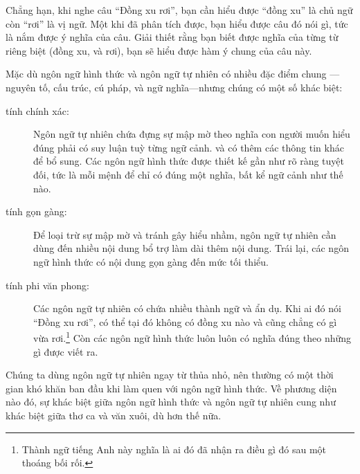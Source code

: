 \documentclass[11pt]{book}
\begin{document}

Chẳng hạn, khi nghe câu ``Đồng xu rơi'', bạn cần hiểu được ``đồng xu''
là chủ ngữ còn ``rơi'' là vị ngữ. Một khi đã phân tích được, bạn hiểu
được câu đó nói gì, tức là nắm được ý nghĩa của câu. Giải thiết rằng
bạn biết được nghĩa của từng từ riêng biệt (đồng xu, và rơi), bạn sẽ
hiểu được hàm ý chung của câu này.

Mặc dù ngôn ngữ hình thức và ngôn ngữ tự nhiên có nhiều đặc điểm chung
---nguyên tố, cấu trúc, cú pháp, và ngữ nghĩa---nhưng chúng có một
số khác biệt:


\begin{description}

\item[tính chính xác:] Ngôn ngữ tự nhiên chứa đựng sự mập mờ
theo nghĩa con người muốn hiểu đúng phải có suy luận tuỳ từng ngữ cảnh.
và có thêm các thông tin khác để bổ sung. Các ngôn ngữ hình thức
được thiết kế gần như rõ ràng tuyệt đối, tức là mỗi mệnh để chỉ có
đúng một nghĩa, bất kể ngữ cảnh như thế nào.

\item[tính gọn gàng:] Để loại trừ sự mập mờ và tránh gây hiểu nhầm,
ngôn ngữ tự nhiên cần dùng đến nhiều nội dung bổ trợ làm dài thêm
nội dung. Trái lại, các ngôn ngữ hình thức có nội dung gọn gàng đến mức
tối thiểu.

\item[tính phi văn phong:] Các ngôn ngữ tự nhiên có chứa nhiều thành ngữ
và ẩn dụ. Khi ai đó nói ``Đồng xu rơi'',  có thể tại đó không có đồng xu nào và 
cũng chẳng có gì vừa rơi.\footnote{Thành ngữ tiếng Anh này nghĩa là ai đó
đã nhận ra điều gì đó sau một thoáng bối rối.}  Còn các ngôn ngữ hình thức luôn luôn
có nghĩa đúng theo những gì được viết ra.

\end{description}

Chúng ta dùng ngôn ngữ tự nhiên ngay từ thủa nhỏ, nên thường có một
thời gian khó khăn ban đầu khi làm quen với ngôn ngữ hình thức. Về phương
diện nào đó, sự khác biệt giữa ngôn ngữ hình thức và ngôn ngữ tự nhiên
cung như khác biệt giữa thơ ca và văn xuôi, dù hơn thế nữa.


\end{document}
